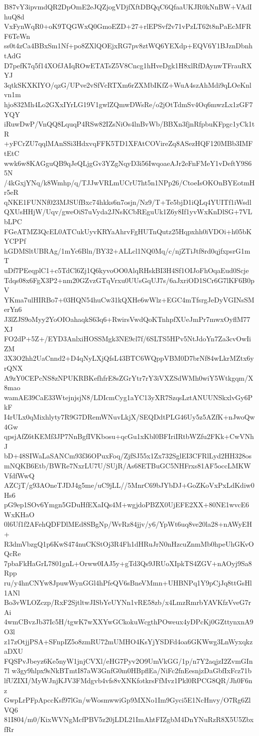 B87vY3ipvmdQR2DpOmE2eJQZjogVDjfXftDBQqC6QfaaUKJR0kNnBW+VAdIhuQ8d
VxFynWqR0+oK9TQGWxQ0GmoEZD+27+rlEPSvf2v71vPzLT62t8nPaEcMFRF6TeWn
ss0t4zCa4BBxSm1Nf+po8ZXlQOEjxRG7pv8ztWQ6YEXdp+EQV6Y1BJznDbnhtAdG
D7pefK7q5f14XOfJAIqROwETATsZ5V8Cncg1hHveDgk1H8xlRfDAynwTFrauRXYJ
3qtkSKXKIYO/qzG/UPve2vSfVcRTXm6rZXMbIKfZ+WuA4szAhMdi9qLOeKnlvn1m
hjo832Mh4Lo2GXxIYrLG19V1gwlZQmwDWsRe/o2jOtTdmSv4Oq6mwzLx1zGF7YQY
iRuwDwP/VnQQ8LquqP4RSw82IZsNiOs4lnBvWb/BBXn3fjnRfpbuKFpgc1yCk1tR
+yFCrZU7qqlMAnSSi3HdxvqFFK5TD1XFAtCOVireZq8ASezHQF120MBb3IMFtEtC
wwk6w8KAGguQB9qJeQLjgGv3YZgNqyD3i56IwqoaeAJr2eFnFMeY1vDeftY9S65N
/4kGxjYNq/k8Wmhp/q/TJJwVRLmUCrU7ht5n1NPp26/CtoeIsOKOnBYEotmHr5eR
qNKE1FUNNf023MJSUfBxc74hkks6n7osjn/Nz9/T+Te5bjD1iQLq4YUITf1iWsdl
QXUsHHjW/Uqv/gweOiS7uVyda2JNsKCbREguUk1Z6y8If1yvWxKnDlSG+7VLbLPC
FGeATMZ3QcEL0ATCukUyvKRYaAhrvFgHUTnQutz25Hqpxhh0iVDOi+h05bKYCPPf
hGDMSltUBRAg/1mYc6Bln/BY32+ALLcl1NQ0Mq/c/njZTiJtf8rd0qjfxpsrG1mT
uDf7PEeqplC1+c5TdCl6Zj1Q6kyvoOO0AlqRHskBI3H4Sf1OIJoFhOqaEud0Scje
Tdqs08x6FgX3P2+nm20GZvzGTqVrxu0UUsGqUJ7s/6aJxriOD1SCr6G7lKF6B0pV
YKma7ulHIRBo7+03HQN54huCw31kQXHe6wWlz+EGC4mTfsrgJeDyVGINsSMerYn6
J3lZJS9oMyy2YoOIOahaqkS63q6+RwirsVwdQoKTnhpfXUeJmPr7mwxOyflM77XJ
FO2dP+5Z+/EYD3AnlxiHOSSMgk3NE9cl7f/6SLTS5HPv5NtJdoYn7Za3cvOwIiZM
3X3O2hh2UaCnnd2+D4qNyLXjQfsL43BTC6WQppVBM0D7brNf84wLkrMZtx6yrQNX
A9zY0CEPcNS8zNPUKRBKefhfrE8sZGrYtr7rY3iVXZSdWMh0wiY5Wtkgqm/X8mao
wamAE39CaE33WtejnjsjN8/LDIcmCyg1aYC13yXR7SzqsLztANUUNSkxlvGy6PkF
I4rULx0qMixhlyty7R9G7DRemWNuvLkjX/SEQDdtPLG46Uy5z5AZfK+nJwoQw4Gw
qpsjAfZ6tKEMf3JP7NnBgfIVKbosu+qcGu1xKbl0BFIriIRtbWZfu2FKk+CwVNhJ
bD+48SIWaLaSANCm93f36OPuxFoq/ZjfSJ55x1Zx732SglEI3CFRlLyd2HH328os
mNQKB6Etb/BWRe7NxrLU7U/SUjR/As68ETBuGC5NHFrxs81AF5occLMKWVfdfWwQ
AZCjT/g93AOneTJDJ4g5me/uC9jLL//5MnrC69bJYbDJ+GoZKoVxPxLdKdiw0Hs6
pG9ep1SOv6Ymgn5GDuHfEXaIQs4M+wgjdoPBZX0UjEFE2XX+80NE1wvcE6WxKHaO
0l6Uf1f2AFehQDFDlMEd8SBgNp/WvRz84jjv/y6/YpWt6uq8ve20la28+nAWyEH+
R3dmVbzgQ1p6KwS474nuCKStOj3R4Fh1dHRuJrN0nHzcuZnmMb0hpeUhGKvOQcRe
7pbaFkHaGrL7801gnL+Orww0IAJ5y+gTd3Qs9JRUoXIpkTS4ZGV+nAOyj9Sa8Rpp
ru/y4hnCNYw8JpuwWynGGl4hPfeQV6sBneVMmn+UHBNPq1Y9pCjJq8ttGsHl1ANl
Bo3vWLOZczp/RxF2SjtltwJISbYeUYNn1vRE58zb/x4LmzRmrbYAVKfzVveG7rAi
4wmCBvzJb37Ic5H/tgwK7wXXYwGCkokuWcgthPOweux4yDPcKj0GZttynxnA9O3l
z17zOtjjPSA+SFnpIZ5o8zmRU72mUMHO4KsYjYSDFd4oa6GKWwg3LnWyxqkzaDXU
FQSPvJbeyz6Ke5nyW1jnjCVXl/eHG7Pyv2O9UmVkGG/1p/n7Y2aqjzI2ZvmGIn7l
w3gy9hlpx9sNkBTmtI87aW3GnfG0m0HBpflEa/NiFc2fnEesnjzDaGbfIxFcz71b
lfUZIXI/MyWJnjKJV3FMdgvb4vfs8vXNKfotkrsFfMvz1Pkl0RPCG8QR/Jh0F6nz
GwpLrPFpApccKsf97lGn/wWosmwwiGp9MXNo1Im9Gyci5E1NcHnvy/O7Rg6ZlVQ6
81I804/m0/KixWVNgMcfPBV5z20jLDL21ImAhtFIZgbM4DnYNuRzR8X5U5ZbxfRr
